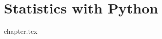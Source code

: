 \documentclass{beamer}
\begin{document}









\section{Statistics with Python}
{chapter.tex}

\end{document}
